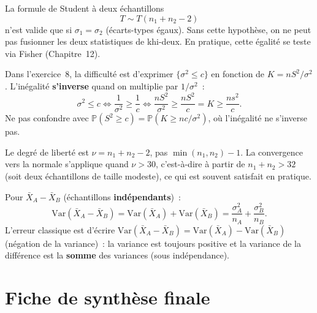 \documentclass[11pt,a4paper]{article}
\newcommand{\Var}{\mathrm{Var}}
\newcommand{\Prob}{\mathbb{P}}
\renewcommand{\P}{\Prob}
\begin{document}
\begin{alertbox}[Pi\`ege 4 --- Hypoth\`ese $\sigma_1=\sigma_2$ oubli\'ee pour le Student \`a 2 \'echantillons]
La formule de Student \`a deux \'echantillons
$$T \sim T(n_1+n_2-2)$$
n'est valide que si $\sigma_1=\sigma_2$ (\'ecarts-types \'egaux). Sans cette hypoth\`ese, on ne peut pas fusionner les deux statistiques de khi-deux. En pratique, cette \'egalit\'e se teste via Fisher (Chapitre~12).
\end{alertbox}

\begin{alertbox}
Dans l'exercice~8, la difficult\'e est d'exprimer $\{\sigma^2\leq c\}$ en fonction de $K=nS^2/\sigma^2$. L'in\'egalit\'e \textbf{s'inverse} quand on multiplie par $1/\sigma^2$~:
$$\sigma^2 \leq c \iff \frac{1}{\sigma^2}\geq\frac{1}{c} \iff \frac{nS^2}{\sigma^2}\geq\frac{nS^2}{c} = K \geq \frac{ns^2}{c}.$$
Ne pas confondre avec $\P(S^2\geq c) = \P(K\geq nc/\sigma^2)$, o\`u l'in\'egalit\'e ne s'inverse pas.
\end{alertbox}

\begin{alertbox}
Le degr\'e de libert\'e est $\nu = n_1+n_2-2$, pas $\min(n_1,n_2)-1$. La convergence vers la normale s'applique quand $\nu>30$, c'est-\`a-dire \`a partir de $n_1+n_2>32$ (soit deux \'echantillons de taille modeste), ce qui est souvent satisfait en pratique.
\end{alertbox}

\begin{alertbox}
Pour $\bar{X}_A-\bar{X}_B$ (\'echantillons \textbf{ind\'ependants})~:
$$\Var(\bar{X}_A-\bar{X}_B) = \Var(\bar{X}_A)+\Var(\bar{X}_B) = \frac{\sigma_A^2}{n_A}+\frac{\sigma_B^2}{n_B}.$$
L'erreur classique est d'\'ecrire $\Var(\bar{X}_A-\bar{X}_B) = \Var(\bar{X}_A)-\Var(\bar{X}_B)$ (n\'egation de la variance)~: la variance est toujours positive et la variance de la diff\'erence est la \textbf{somme} des variances (sous ind\'ependance).
\end{alertbox}

\newpage
\section*{Fiche de synth\`ese finale}
\end{document}

